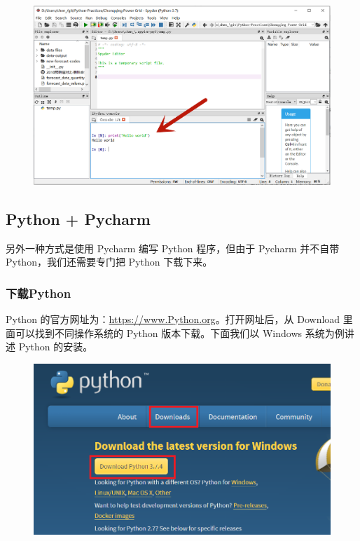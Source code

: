 \begin{figure}[!ht]
  \centering
  \includegraphics[scale=0.4]{figure/chapter1/anaconda5.png}
\end{figure}



\subsection{Python + Pycharm}

另外一种方式是使用 Pycharm 编写 Python 程序，但由于 Pycharm 并不自带 Python，我们还需要专门把 Python 下载下来。

\subsubsection{下载Python}

Python 的官方网址为：\href{https://www.Python.org}{https://www.Python.org}。打开网址后，从 Download 里面可以找到不同操作系统的 Python 版本下载。下面我们以 Windows 系统为例讲述 Python 的安装。

\begin{figure}[!ht]
  \centering
  \includegraphics[scale=0.6]{figure/chapter1/PythonDownload.png}
\end{figure}

